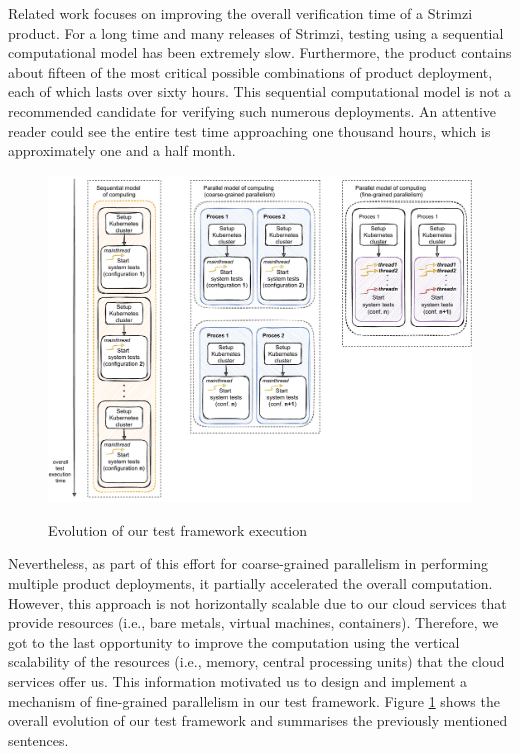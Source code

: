 Related work focuses on improving the overall verification time of a Strimzi product.
For a long time and many releases of Strimzi, testing using a sequential computational model has been extremely slow.
Furthermore, the product contains about fifteen of the most critical possible combinations of product deployment, each of which lasts over sixty hours.
This sequential computational model is not a recommended candidate for verifying such numerous deployments.
An attentive reader could see the entire test time approaching one thousand hours, which is approximately one and a half month.
\begin{figure}[!ht]
    \centering
    \includegraphics[scale=0.7]{obrazky-figures/01-intro/00-intro-better-one}
    \label{00:fig:evolution}
    \caption{Evolution of our test framework execution}
\end{figure}
Nevertheless, as part of this effort for coarse-grained parallelism in performing multiple product deployments, it partially accelerated the overall computation.
However, this approach is not horizontally scalable due to our cloud services that provide resources (i.e., bare metals, virtual machines, containers).
Therefore, we got to the last opportunity to improve the computation using the vertical scalability of the resources (i.e., memory, central processing units) that the cloud services offer us.
This information motivated us to design and implement a mechanism of fine-grained parallelism in our test framework.
Figure \ref{00:fig:evolution} shows the overall evolution of our test framework and summarises the previously mentioned sentences.
\bigskip


